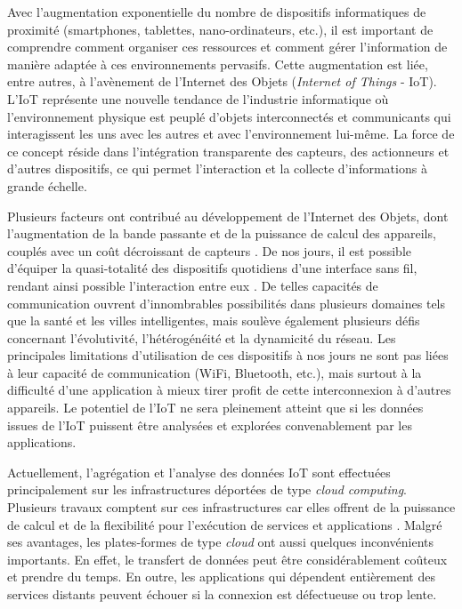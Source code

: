 Avec l'augmentation exponentielle du nombre de dispositifs informatiques de proximité (smartphones, tablettes, nano-ordinateurs, etc.), il est important de comprendre comment organiser ces ressources et comment gérer l'information de manière adaptée à ces environnements pervasifs. 
Cette augmentation est liée, entre autres, à l'avènement de l'Internet des Objets (\textit{Internet of Things} - IoT). L'IoT représente une nouvelle tendance de l'industrie informatique où l'environnement physique est peuplé d'objets interconnectés et communicants qui interagissent les uns avec les autres et avec l'environnement lui-même. La force de ce concept réside dans l'intégration transparente des capteurs, des actionneurs et d'autres dispositifs, ce qui permet l'interaction et la collecte d'informations à grande échelle.

Plusieurs facteurs ont contribué au développement de l'Internet des Objets, dont l'augmentation de la bande passante et de la puissance de calcul des appareils, couplés avec un coût décroissant de capteurs \cite{Jones2014}. De nos jours, il est possible d'équiper la quasi-totalité des dispositifs quotidiens d'une interface sans fil, rendant ainsi possible l'interaction entre eux \cite{Paridel2010}. De telles capacités de communication ouvrent d'innombrables possibilités dans plusieurs domaines tels que la santé et les villes intelligentes, mais soulève également plusieurs défis concernant l'évolutivité, l'hétérogénéité et la dynamicité du réseau. Les principales limitations d'utilisation de ces dispositifs à nos jours ne sont pas liées à leur capacité de communication (WiFi, Bluetooth, etc.), mais surtout à la difficulté d'une application à mieux tirer profit de cette interconnexion à d'autres appareils. Le  potentiel de l'IoT ne sera pleinement atteint que si les données issues de l'IoT puissent être analysées et explorées convenablement par les applications.

Actuellement, l'agrégation et l'analyse des données IoT sont effectuées principalement sur les infrastructures déportées de type \textit{cloud computing}. Plusieurs travaux \cite{Miorandi2012, Gubbi2013, Fazio2015} comptent sur ces infrastructures car elles offrent de la puissance de calcul  et de la flexibilité pour l'exécution de services et applications \cite{Serrano2013}. Malgré ses avantages, les plates-formes de type \textit{cloud} ont aussi quelques inconvénients importants. En effet, le transfert de données %
peut être considérablement coûteux et prendre du temps. En outre, les applications qui dépendent entièrement des services distants peuvent échouer si la connexion est défectueuse ou trop lente.

